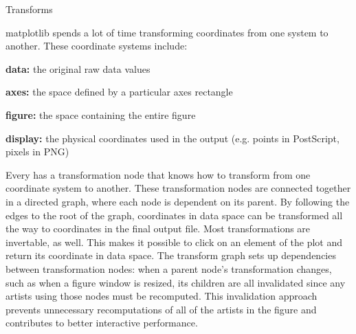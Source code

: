 \begin{aosasect1}{Transforms}


matplotlib spends a lot of time transforming coordinates from one
system to another.  These coordinate systems include:

\begin{aosaitemize}
\item \textbf{data:} the original raw data values

\item \textbf{axes:} the space defined by a particular axes rectangle

\item \textbf{figure:} the space containing the entire figure

\item \textbf{display:} the physical coordinates used in the output
  (e.g. points in PostScript, pixels in PNG)
\end{aosaitemize}

Every  has a transformation node that knows how to
transform from one coordinate system to another.  These transformation
nodes are connected together in a directed graph, where each node is
dependent on its parent.  By following the edges to the root of the
graph, coordinates in data space can be transformed all the way to
coordinates in the final output file.  Most transformations are
invertable, as well.  This makes it possible to click on an element of
the plot and return its coordinate in data space.  The transform graph
sets up dependencies between transformation nodes: when a parent
node's transformation changes, such as when a figure window is
resized, its children are all invalidated since any artists using
those nodes must be recomputed.  This invalidation approach prevents
unnecessary recomputations of all of the artists in the figure and
contributes to better interactive performance.


\end{aosasect1}
